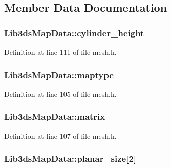 \subsection{Member Data Documentation}
\hypertarget{struct_lib3ds_map_data_a75d5a41a547efec2dfe567bb597a4dc1}{
\subsubsection[{cylinder\-\_\-height}]{ Lib3ds\-Map\-Data\-::cylinder\-\_\-height}}\label{struct_lib3ds_map_data_a75d5a41a547efec2dfe567bb597a4dc1}


Definition at line 111 of file mesh.\-h.

\hypertarget{struct_lib3ds_map_data_a6b387e6dc4e87941c0e9646f51de8c2f}{
\subsubsection[{maptype}]{ Lib3ds\-Map\-Data\-::maptype}}\label{struct_lib3ds_map_data_a6b387e6dc4e87941c0e9646f51de8c2f}


Definition at line 105 of file mesh.\-h.

\hypertarget{struct_lib3ds_map_data_a1be7c131fcc6989966ad1f7153800eb8}{
\subsubsection[{matrix}]{ Lib3ds\-Map\-Data\-::matrix}}\label{struct_lib3ds_map_data_a1be7c131fcc6989966ad1f7153800eb8}


Definition at line 107 of file mesh.\-h.

\hypertarget{struct_lib3ds_map_data_a6f35fc1d991c188f07f7a7c7451997e4}{
\subsubsection[{planar\-\_\-size}]{ Lib3ds\-Map\-Data\-::planar\-\_\-size\mbox{[}2\mbox{]}}}\label{struct_lib3ds_map_data_a6f35fc1d991c188f07f7a7c7451997e4}


